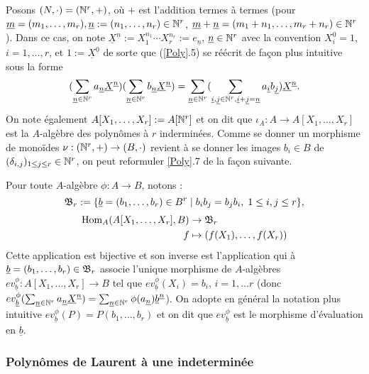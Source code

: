 	Posons $(N,\cdot)=(\mathbb{N}^r,+)$, où $+$ est l'addition termes à termes (pour $\underline{m}=(m_1,\dots,m_r), \underline{n}:=(n_1,\dots, n_r)\in \mathbb{N}^r$,   $\underline{m}+\underline{n}=(m_1+n_1,\dots,m_r+n_r)\in \mathbb{N}^r$). Dans ce cas, on note $\underline{X}^{\underline{n}}:=X_1^{n_1}\cdots X_r^{n_r}:=e_{\underline{n}}$, $\underline{n}\in \mathbb{N}^r$ avec la convention $X_i^0=1$, $i=1,\dots, r$,  et $1:=\underline{X}^{\underline{0}}$ de sorte que (\ref{Poly}.5) se réécrit de façon plus intuitive sous la forme
 $$ (\sum_{\underline{n}\in\mathbb{N}^r}a_{\underline{n}}\underline{X}^{\underline{n}}) (\sum_{\underline{n}\in \mathbb{N}^r}b_{\underline{n}}\underline{X}^{\underline{n}})=\sum_{\underline{n}\in \mathbb{N}^r}(\sum_{\underline{i},\underline{j}\in \mathbb{N}^r, \underline{i}+\underline{j}=\underline{n}}a_{\underline{i}}b_{\underline{j}})\underline{X}^{\underline{n}}.$$
On note également $A[X_1,\dots, X_r]:=A[\mathbb{N}^r]$ et on dit que $\iota_A:A\rightarrow A[X_1,\dots, X_r]$ est la $A$-algèbre des polynômes à $r$ inderminées. Comme se donner un morphisme de monoïdes $\nu:(\mathbb{N}^r,+)\rightarrow (B ,\cdot)$ revient à se donner les images $b_i\in B $ de $(\delta_{i,j})_{1\leq j\leq r}\in \mathbb{N}^r$, on peut reformuler \ref{Poly}.7 de la façon suivante.

\begin{definition}Pour toute $A$-algèbre $\phi:A\rightarrow B$, notons :
 $$\frak{B}_r:= \lbrace \underline{b}=(b_1,\dots, b_r)\in B^r\;|\; b_ib_j=b_jb_i,\; 1\leq i,j\leq r\rbrace,$$
	\begin{align*} \operatorname{Hom}_A(A[X_1,\dots,X_r],B) &\to \frak{B}_r \\ f &\mapsto (f(X_1),\dots, f(X_r))\end{align*}
Cette application est bijective et son inverse est l'application qui à $\underline{b}=(b_1,\dots, b_r)\in \frak{B}_r$ associe l'unique morphisme de $A$-algèbres $ev_{\underline{b}}^\phi:A[X_1,\dots, X_r]\rightarrow B$ tel que $ev_{\underline{b}}^\phi(X_i)=b_i$, $i=1,\dots r$ (donc $ev_{\underline{b}}^\phi(\sum_{\underline{n}\in \mathbb{N}^r}a_{\underline{n}}\underline{X}^{\underline{n}})=\sum_{\underline{n}\in \mathbb{N}^r}\phi(a_{\underline{n}})\underline{b}^{\underline{n}}$). On adopte  en général la notation plus intuitive $ev_{\underline{b}}^\phi(P)=P(b_1,\dots, b_r)$ et on dit que $ev_{\underline{b}}^\phi$ est le morphisme d'évaluation en $\underline{b}$.\end{definition}

\subsubsection{Polynômes de Laurent à une indeterminée}

